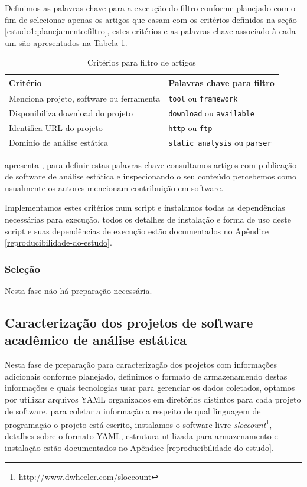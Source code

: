 Definimos as palavras chave para a execução do filtro conforme planejado com
o fim de selecionar apenas os artigos que casam com os critérios definidos
na seção \ref{estudo1:planejamento:filtro}, estes critérios e as palavras chave
associado à cada um são apresentados na Tabela \ref{criterios-filtro}.

\begin{table}[h]
\caption{Critérios para filtro de artigos}
\centering
\begin{tabular}{ l l }
  \hline
  Critério                                 & Palavras chave para filtro            \\
  \hline
  Menciona projeto, software ou ferramenta & {\tt tool} ou {\tt framework}         \\
  Disponibiliza download do projeto        & {\tt download} ou {\tt available}     \\
  Identifica URL do projeto                & {\tt http} ou {\tt ftp}               \\
  Domínio de análise estática              & {\tt static analysis} ou {\tt parser} \\
  \hline
\end{tabular}
\label{criterios-filtro}
\end{table}

apresenta , para definir
estas palavras chave consultamos artigos com publicação de software de análise
estática e inspecionando o seu conteúdo percebemos como usualmente os
autores mencionam contribuição em software.


Implementamos estes critérios num script e instalamos todas as dependências
necessárias para execução, todos os detalhes de instalação e forma de uso deste
script e suas dependências de execução estão documentados no Apêndice
\ref{reproducibilidade-do-estudo}.

\subsubsection{Seleção}

Nesta fase não há preparação necessária.


\subsection{Caracterização dos projetos de software acadêmico de análise estática} %

Nesta fase de preparação para caracterização dos projetos com informações
adicionais conforme planejado, definimos o formato de armazenamendo destas
informações e quais tecnologias usar para gerenciar os dados coletados, optamos
por utilizar arquivos YAML organizados em diretórios distintos para cada
projeto de software, para coletar a informação a respeito de qual linguagem de
programação o projeto está escrito, instalamos o software livre {\it
sloccount}\footnote{http://www.dwheeler.com/sloccount}, detalhes sobre o
formato YAML, estrutura utilizada para armazenamento e instalação estão
documentados no Apêndice \ref{reproducibilidade-do-estudo}.

